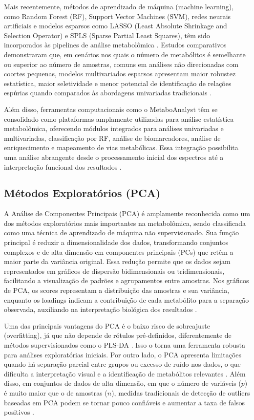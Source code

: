Mais recentemente, métodos de aprendizado de máquina (machine learning), como Random Forest (RF), Support Vector Machines (SVM), redes neurais artificiais e modelos esparsos como LASSO (Least Absolute Shrinkage and Selection Operator) e SPLS (Sparse Partial Least Squares), têm sido incorporados às pipelines de análise metabolômica \cite{anwardeen2023statistical}. Estudos comparativos demonstraram que, em cenários nos quais o número de metabólitos é semelhante ou superior ao número de amostras, comuns em análises não direcionadas com coortes pequenas, modelos multivariados esparsos apresentam maior robustez estatística, maior seletividade e menor potencial de identificação de relações espúrias quando comparados às abordagens univariadas tradicionais \cite{henglin2022quantitative}.

Além disso, ferramentas computacionais como o MetaboAnalyst têm se consolidado como plataformas amplamente utilizadas para análise estatística metabolômica, oferecendo módulos integrados para análises univariadas e multivariadas, classificação por RF, análise de biomarcadores, análise de enriquecimento e mapeamento de vias metabólicas. Essa integração possibilita uma análise abrangente desde o processamento inicial dos espectros até a interpretação funcional dos resultados \cite{pang2024metaboanalyst}.

\subsection{Métodos Exploratórios (PCA)}

A Análise de Componentes Principais (PCA) é amplamente reconhecida como um dos métodos exploratórios mais importantes na metabolômica, sendo classificada como uma técnica de aprendizado de máquina não supervisionado. Sua função principal é reduzir a dimensionalidade dos dados, transformando conjuntos complexos e de alta dimensão em componentes principais (PCs) que retêm a maior parte da variância original. Essa redução permite que os dados sejam representados em gráficos de dispersão bidimensionais ou tridimensionais, facilitando a visualização de padrões e agrupamentos entre amostras. Nos gráficos de PCA, os scores representam a distribuição das amostras e sua variância, enquanto os loadings indicam a contribuição de cada metabólito para a separação observada, auxiliando na interpretação biológica dos resultados \cite{mayonu2026evaluation}.

Uma das principais vantagens do PCA é o baixo risco de sobreajuste (overfitting), já que não depende de rótulos pré-definidos, diferentemente de métodos supervisionados como o PLS-DA \cite{jiang2022principal}. Isso o torna uma ferramenta robusta para análises exploratórias iniciais. Por outro lado, o PCA apresenta limitações quando há separação parcial entre grupos ou excesso de ruído nos dados, o que dificulta a interpretação visual e a identificação de metabólitos relevantes \cite{mayonu2026evaluation}. Além disso, em conjuntos de dados de alta dimensão, em que o número de variáveis ($p$) é muito maior que o de amostras ($n$), medidas tradicionais de detecção de outliers baseadas em PCA podem se tornar pouco confiáveis e aumentar a taxa de falsos positivos \cite{brini2021improved}.

